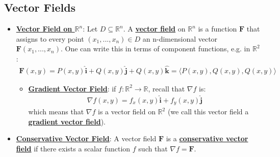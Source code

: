 \documentclass[reqno,11pt]{amsart}
\theoremstyle{definition}
\theoremstyle{remark}
\newcommand{\R}{\mathbb{R}}
\newcommand{\dfn}[1]{\underline{\textbf{#1}}}
\begin{document}
\subsection{Vector Fields}
\begin{itemize}[noitemsep]
	\item \dfn{Vector Field on $\R^n$}: Let $D \subseteq \R^n$. A \dfn{vector field} on $\R^n$ is a function $\mathbf{F}$ that assigns to every point $(x_1, ..., x_n) \in D$ an n-dimensional vector $\mathbf{F}(x_1, ..., x_n)$. One can write this in terms of component functions, e.g. in $\R^2$: 
	\begin{align}
		\mathbf{F}(x,y) = P(x,y) \mathbf{\hat{i}} + Q(x,y) \mathbf{\hat{j}} + Q(x,y) \hat{\mathbf{k}}  = \langle P(x,y), Q(x,y), Q(x,y) \rangle 	
	\end{align}
	\begin{itemize}
		\item \dfn{Gradient Vector Field}: if $f: \R^2 \rightarrow \R$, recall that $\nabla f$ is: 
		\begin{align}
			\nabla f(x,y) = f_x(x,y) \hat{\mathbf{i}} + f_y(x,y) \hat{\mathbf{j}} 	
		\end{align}
		which means that $\nabla f$ is a vector field on $\R^2$ (we call this vector field a \dfn{gradient vector field}).
	\end{itemize}
	\item \dfn{Conservative Vector Field}: A vector field $\mathbf{F}$ is a \dfn{conservative vector field} if there exists a scalar function $f$ such that $\nabla f = \mathbf{F}$. 
\end{itemize}
\end{document}
